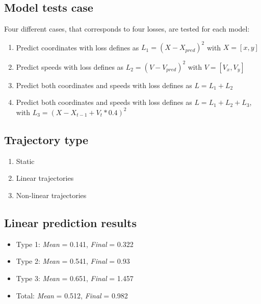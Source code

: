 \documentclass[a0,portrait]{a0poster}
\begin{document}
\begin{multicols}{2}
\subsection*{Model tests case}
Four different cases, that corresponds to four losses, are tested for each model:
\begin{enumerate}
\justifying
\item Predict coordinates with loss defines as $L_1 = (X-X_{pred})^2$ with $X = [x,y]$
\item Predict speeds with loss defines as $L_2 = (V-V_{pred})^2$ with $V = [V_x,V_y]$ 
\item Predict both coordinates and speeds with loss defines as $L = L_1 + L_2$
\item Predict both coordinates and speeds with loss defines as $L = L_1 + L_2 + L_3 $, with $L_3 = (X- X_{t-1} + V_t*0.4)^2$
\end{enumerate}


\begin{minipage}[]{0.5\linewidth}
\subsection*{Trajectory type}
\begin{enumerate}
\justifying
\item Static
\item Linear trajectories
\item Non-linear trajectories
\end{enumerate}
\end{minipage}
\hfill
\begin{minipage}[]{0.5\linewidth}
\subsection*{Linear prediction results}
\begin{itemize}
\item Type 1: \emph{Mean} = 0.141, \emph{Final} = 0.322
\item Type 2: \emph{Mean} = 0.541, \emph{Final} = 0.93
\item Type 3: \emph{Mean} = 0.651, \emph{Final} = 1.457
\item Total: \emph{Mean} = 0.512, \emph{Final} = 0.982 
\end{itemize}
\end{minipage}


\end{multicols}
\end{document}
